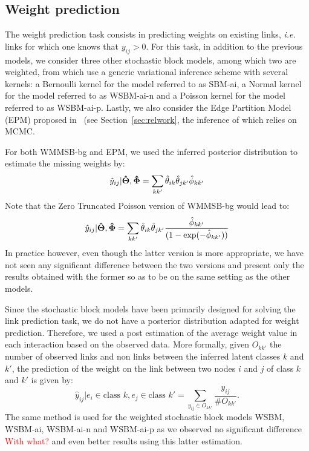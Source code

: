 \begin{table*}[t]
\centering
	
\label{table:roc}
\end{table*}

\subsection{Weight prediction}

The weight prediction task consists in predicting weights on existing links, \textit{i.e.} links for which one knows that $y_{ij} > 0$. For this task, in addition to the previous models, we consider three other stochastic block models, among which two are weighted, from \cite{aicher2014learning} which use a generic variational inference scheme with several kernels: a Bernoulli kernel for the model referred to as SBM-ai, a Normal kernel for the model referred to as WSBM-ai-n and a Poisson kernel for the model referred to as WSBM-ai-p. Lastly, we also consider the Edge Partition Model (EPM) proposed in~\cite{zhou2015} (see Section~\ref{sec:relwork}, the inference of which relies on MCMC.

For both WMMSB-bg and EPM, we used the inferred posterior distribution to estimate the missing weights by:
%
\[
\hat y_{ij} | \boldsymbol{\hat\Theta}, \boldsymbol{\hat\Phi} = \sum_{kk'} \hat\theta_{ik} \hat\theta_{jk'} \hat\phi_{kk'}
\]
%
Note that the Zero Truncated Poisson version of WMMSB-bg would lead to:
%
\[
\hat y_{ij} | \boldsymbol{\hat\Theta}, \boldsymbol{\hat\Phi} = \sum_{kk'} \hat\theta_{ik} \hat\theta_{jk'} \frac{\hat\phi_{kk'}}{(1 - \exp(-\hat\phi_{kk'}))}
\]
%
In practice however, even though the latter version is more appropriate, we have not seen any significant difference between the two versions and present only the results obtained with the former so as to be on the same setting as the other models.

Since the stochastic block models have been primarily designed for solving the link prediction task, we do not have a posterior distribution adapted for weight prediction. Therefore, we used a post estimation of the average weight value in each interaction based on the observed data. More formally, given $O_{kk'}$ the number of observed links and non links between the inferred latent classes $k$ and $k'$, the prediction of the weight on the link between two nodes $i$ and $j$ of class $k$ and $k'$ is given by:
%
\[
\hat y_{ij} | e_i \in \text{class } k, e_j \in \text{class }k' = \sum_{y_{ij} \in O_{kk'}} \frac{y_{ij}}{\# O_{kk'}}.
\]
%
The same method is used for the weighted stochastic block models WSBM, WSBM-ai, WSBM-ai-n and WSBM-ai-p as we observed no significant difference \textcolor{red}{With what?} and even better results using this latter estimation.

